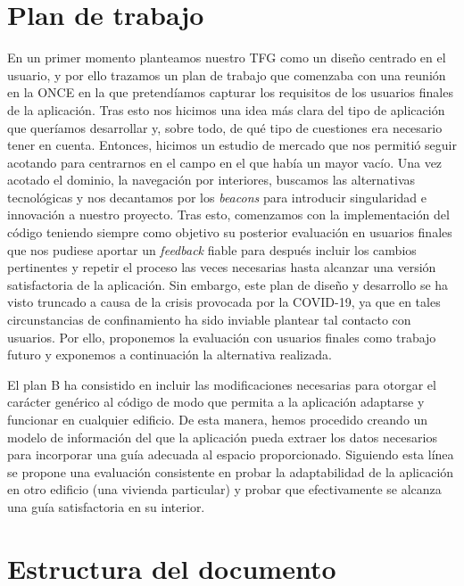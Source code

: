\section{Plan de trabajo}
\label{sec:planTrabajo}

En un primer momento planteamos nuestro TFG como un diseño centrado en el usuario, y por ello trazamos un plan de trabajo que comenzaba con una reunión en la ONCE en la que pretendíamos capturar los requisitos de los usuarios finales de la aplicación. Tras esto nos hicimos una idea más clara del tipo de aplicación que queríamos desarrollar y, sobre todo, de qué tipo de cuestiones era necesario tener en cuenta. Entonces, hicimos un estudio de mercado que nos permitió seguir acotando para centrarnos en el campo en el que había un mayor vacío. Una vez acotado el dominio, la navegación por interiores, buscamos las alternativas tecnológicas y nos decantamos por los \textit{beacons} para introducir singularidad e innovación a nuestro proyecto. Tras esto, comenzamos con la implementación del código teniendo siempre como objetivo su posterior evaluación en usuarios finales que nos pudiese aportar un \textit{feedback} fiable para después incluir los cambios pertinentes y repetir el proceso las veces necesarias hasta alcanzar una versión satisfactoria de la aplicación. Sin embargo, este plan de diseño y desarrollo se ha visto truncado a causa de la crisis provocada por la COVID-19, ya que en tales circunstancias de confinamiento ha sido inviable plantear tal contacto con usuarios. Por ello, proponemos la evaluación con usuarios finales como trabajo futuro y exponemos a continuación la alternativa realizada.

El plan B ha consistido en incluir las modificaciones necesarias para otorgar el carácter genérico al código de modo que permita a la aplicación adaptarse y funcionar en cualquier edificio. De esta manera, hemos procedido creando un modelo de información del que la aplicación pueda extraer los datos necesarios para incorporar una guía adecuada al espacio proporcionado. Siguiendo esta línea se propone una evaluación consistente en probar la adaptabilidad de la aplicación en otro edificio (una vivienda particular) y probar que efectivamente se alcanza una guía satisfactoria en su interior.



\section{Estructura del documento}
\label{sec:estructDoc}

